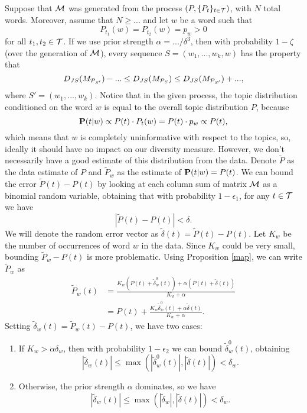 \documentclass{article}
\begin{document}
 



\bep
Suppose that ${\mathcal M}$ was generated from the process
$(P,\{P_t\}_{t\in {\mathcal T}})$, with $N$ total words. Moreover,
assume that $N\geq ...$ and let 
$w$ be a word such that \[P_{t_1}(w)=P_{t_2}(w)=p_w>0\] for all
$t_1,t_2\in {\mathcal T}$. If we use prior strength $\alpha = .../\delta^3$, then with
probability $1-\zeta$ (over the generation of ${\mathcal M}$), every
sequence $S=(w_1,...,w_k,w)$ has the property that 
\[D_{JS}(M_{{\mathcal P}_{S'}})-...\leq D_{JS}(M_{{\mathcal P}_S})\leq
D_{JS}(M_{{\mathcal P}_{S'}})+...,\]
where $S' = (w_1,...,w_k)$.
\eep
\proof
Notice that in the given process, the topic distribution conditioned
on the word $w$ is equal to the overall topic distribution $P$,
because
\[\operatorname{\mathbf{P}}(t|w) \propto P(t)\cdot P_t(w)=P(t)\cdot p_w\propto P(t),\]
which means that $w$ is completely uninformative with respect to the
topics, so, ideally it should have no impact on our diversity measure.
However, we don't necessarily have a good estimate of this
distribution from the data. Denote $\tilde{P}$ as the data estimate of
$P$ and $\tilde{P}_w$ as the estimate of $\operatorname{\mathbf{P}}(t|w)=P(t)$. We can
bound the error $\tilde{P}(t)-P(t)$ by looking at each column sum of
matrix ${\mathcal M}$ as a binomial random variable, obtaining that with
probability $1-\epsilon_1$, for any $t\in {\mathcal T}$ we have 
\[|\tilde{P}(t)-P(t)| < \delta.\]
We will denote the random error vector as
$\tilde{\delta}(t)=\tilde{P}(t)-P(t)$. 
Let $K_w$ be the number of
occurrences of word $w$ in the data.
Since $K_w$ could be very small, bounding $\tilde{P}_w-P(t)$ is more
problematic. Using Proposition \ref{map}, we can write $\tilde{P}_w$ as
\begin{align*}
\tilde{P}_w(t) &= \frac{K_w(P(t)+\tilde{\delta}_w^0(t)) +
\alpha(P(t)+\tilde{\delta}(t))}{K_w+\alpha} \\
&= P(t) + \frac{K_w\tilde{\delta}_w^0(t) + \alpha \tilde{\delta}(t)}{K_w + \alpha}. 
\end{align*}
Setting $\tilde{\delta}_w(t)=\tilde{P}_w(t)-P(t)$, we have two cases:
\begin{enumerate}
\item If $K_w>\alpha\delta_w$, then with probability $1-\epsilon_2$ we can bound
$\tilde{\delta}_w^0(t)$, obtaining
\[|\tilde{\delta}_w(t)|\leq\max(|\tilde{\delta}_w^0(t)|,|\tilde{\delta}(t)|)
< \delta_w.\] 
\item Otherwise, the prior strength $\alpha$ dominates, so we have
\[|\tilde{\delta}_w(t)|\leq\max(|\tilde{\delta}_w|,|\tilde{\delta}(t)|) < \delta_w.\]
\end{enumerate}
\end{document}
